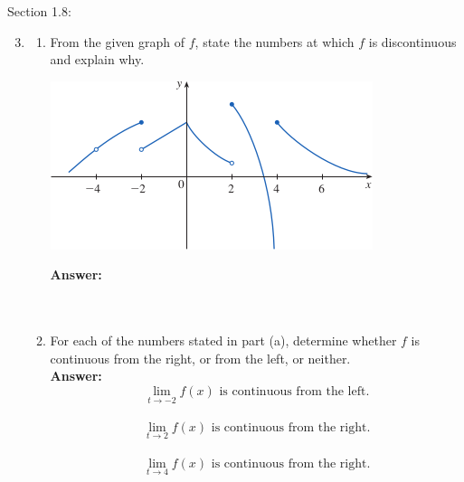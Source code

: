 \documentclass[12pt]{article}
\begin{document}
\newpage
Section 1.8:
\begin{enumerate}
\setcounter{enumi}{2}   
    \item
    \begin{enumerate}
        \item From the given graph of $f$, state the numbers at which $f$ is discontinuous and explain why.
        \begin{center}
            \includegraphics{Images/Image-2.png}    
        \end{center}
        \textbf{Answer: } \\~\\
        \noindent{}
        \\
        \item For each of the numbers stated in part (a), determine whether $f$ is continuous from the right, or from the left, or neither.\\
        \textbf{Answer: }\\
        \[ \boxed{{\displaystyle\lim_{t\to -2} f(x)} \text{ is continuous from the left.}}\]\\
        \[ \boxed{{\displaystyle\lim_{t\to 2} f(x)} \text{ is continuous from the right.}}\]\\
        \[ \boxed{{\displaystyle\lim_{t\to 4} f(x)} \text{ is continuous from the right.}}\]\\
    \end{enumerate} 

\end{enumerate}
\end{document}

